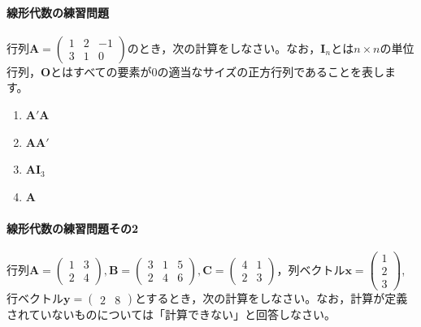 \paragraph{線形代数の練習問題}行列$\bm{A}=\begin{pmatrix}1 & 2 & -1\\3 & 1 & 0\end{pmatrix}$のとき，次の計算をしなさい。なお，$\bm{I}_n$とは$n \times n$の単位行列，$\bm{O}$とはすべての要素が0の適当なサイズの正方行列であることを表します。
\begin{enumerate}
	\item $\bm{A}'\bm{A}$
	\item $\bm{AA}'$
	\item $\bm{A}\bm{I}_3$
	\item $\bm{A}$
\end{enumerate}
\paragraph{線形代数の練習問題その2}行列$\bm{A}=\begin{pmatrix}1 & 3 \\2 & 4\end{pmatrix},\bm{B}=\begin{pmatrix}3&1&5\\2&4&6\end{pmatrix},\bm{C}=\begin{pmatrix}4&1\\2&3\end{pmatrix}$，列ベクトル$\bm{x}=\begin{pmatrix}1\\2\\3\end{pmatrix}$,行ベクトル$\bm{y}=\begin{pmatrix}2&8\end{pmatrix}$とするとき，次の計算をしなさい。なお，計算が定義されていないものについては「計算できない」と回答しなさい。

